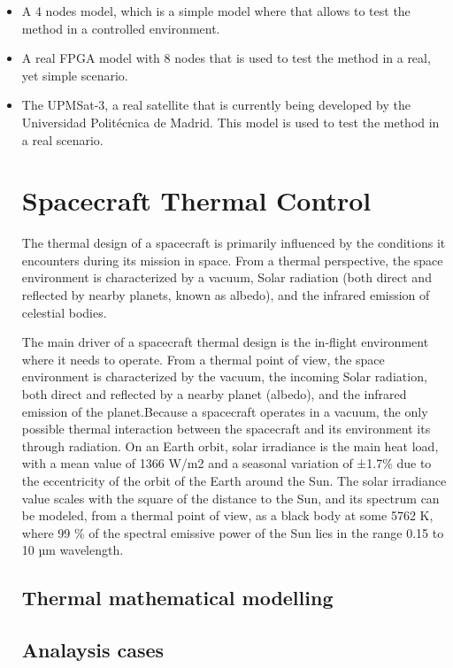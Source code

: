\begin{itemize}
	\item A 4 nodes model, which is a simple model where  that allows to test the method in a controlled environment.
	\item A real FPGA model with 8 nodes that is used to test the method in a real, yet simple scenario.
	\item The UPMSat-3, a real satellite that is currently being developed by the Universidad Politécnica de Madrid. This model is used to test the method in a real scenario.




\section{Spacecraft Thermal Control}

The thermal design of a spacecraft is primarily influenced by the conditions it encounters during its mission in space. From a thermal perspective, the space environment is characterized by a vacuum, Solar radiation (both direct and reflected by nearby planets, known as albedo), and the infrared emission of celestial bodies.

The main driver of a spacecraft thermal design is the in-flight environment where it needs to operate. From a thermal point of view, the space environment is characterized by the vacuum, the incoming Solar radiation, both direct and reflected by a nearby planet (albedo), and the infrared
emission of the planet.Because a spacecraft operates in a vacuum, the only possible thermal interaction between the spacecraft and its environment its through radiation. On an Earth orbit, solar irradiance is the main heat load, with a mean value of 1366 W/m2 and a seasonal variation of ±1.7\% due to the eccentricity of the orbit of the Earth around the Sun. The solar irradiance value scales with the square of the distance to the Sun, and its spectrum can be modeled, from a thermal point of view, as a black body at some 5762 K, where 99 \% of the spectral emissive power of the Sun lies in the range 0.15 to 10 µm wavelength.

\subsection{Thermal mathematical modelling}
\subsection{Analaysis cases}

\end{itemize}
